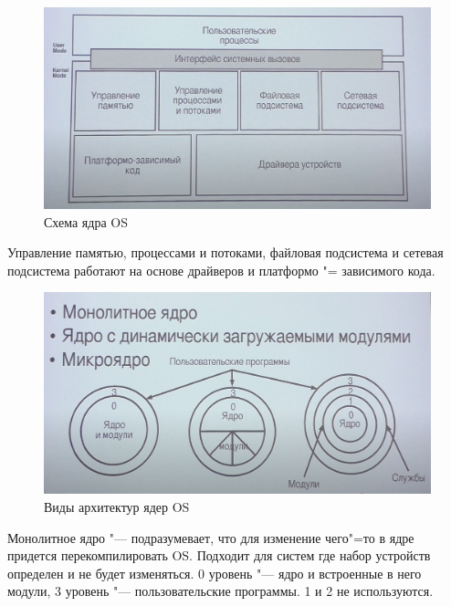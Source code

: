 \documentclass[bachelor, och, pract]{SCWorks}
\theoremstyle{remark}
\begin{document}
    \begin{figure}[H]
        \begin{center}
            \includegraphics[scale=0.4]{res/OS-kernel-diagram.png}
            \caption{Схема ядра OS}
        \end{center}
    \end{figure}

    Управление памятью, процессами и потоками, файловая подсистема и сетевая подсистема работают на основе драйверов и платформо "= зависимого кода.

    \begin{figure}[H]
        \begin{center}
            \includegraphics[scale=0.4]{res/kernel-architectures.png}
            \caption{Виды архитектур ядер OS}
        \end{center}
    \end{figure}

    Монолитное ядро "--- подразумевает, что для изменение чего"=то в ядре придется перекомпилировать OS. Подходит для систем где набор устройств определен и не будет изменяться. 0 уровень "--- ядро и встроенные в него модули, 3 уровень "--- пользовательские программы. 1 и 2 не используются.
\end{document}
